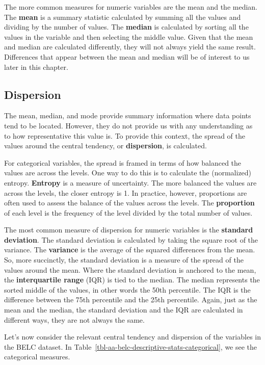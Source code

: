 \documentclass[
  letterpaper,
]{latex/krantz}
\theoremstyle{definition}
\theoremstyle{remark}
\begin{document}
The more common measures for numeric variables are the mean and the
median. The \textbf{mean} is a summary statistic calculated by summing
all the values and dividing by the number of values. The \textbf{median}
is calculated by sorting all the values in the variable and then
selecting the middle value. Given that the mean and median are
calculated differently, they will not always yield the same result.
Differences that appear between the mean and median will be of interest
to us later in this chapter.

\subsection{Dispersion}\label{dispersion}

The mean, median, and mode provide summary information where data points
tend to be located. However, they do not provide us with any
understanding as to how representative this value is. To provide this
context, the spread of the values around the central tendency, or
\textbf{dispersion}, is calculated.

For categorical variables, the spread is framed in terms of how balanced
the values are across the levels. One way to do this is to calculate the
(normalized) entropy. \textbf{Entropy} is a measure of uncertainty. The
more balanced the values are across the levels, the closer entropy is 1.
In practice, however, proportions are often used to assess the balance
of the values across the levels. The \textbf{proportion} of each level
is the frequency of the level divided by the total number of values.

The most common measure of dispersion for numeric variables is the
\textbf{standard deviation}. The standard deviation is calculated by
taking the square root of the variance. The \textbf{variance} is the
average of the squared differences from the mean. So, more succinctly,
the standard deviation is a measure of the spread of the values around
the mean. Where the standard deviation is anchored to the mean, the
\textbf{interquartile range} (IQR) is tied to the median. The median
represents the sorted middle of the values, in other words the 50th
percentile. The IQR is the difference between the 75th percentile and
the 25th percentile. Again, just as the mean and the median, the
standard deviation and the IQR are calculated in different ways, they
are not always the same.

Let's now consider the relevant central tendency and dispersion of the
variables in the BELC dataset. In
Table~\ref{tbl-aa-belc-descriptive-stats-categorical}, we see the
categorical measures.
\end{document}
